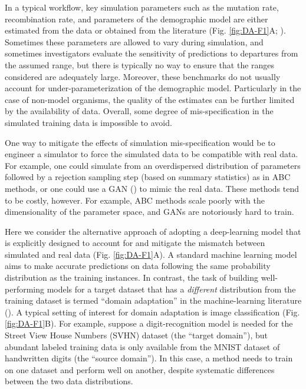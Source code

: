 In a typical workflow, key simulation parameters such as the mutation rate, recombination rate, and parameters of the demographic model are either estimated from the data or obtained from the literature (Fig. \ref{fig:DA-F1}A; \cite{adrion_community-maintained_2020,lauterbur_expanding_2022}). Sometimes these parameters are allowed to vary during simulation, and sometimes investigators evaluate the sensitivity of predictions to departures from the assumed range, but there is typically no way to ensure that the ranges considered are adequately large. Moreover, these benchmarks do not usually account for under-parameterization of the demographic model. Particularly in the case of non-model organisms, the quality of the estimates can be further limited by the availability of data. Overall, some degree of mis-specification in the simulated training data is impossible to avoid.

One way to mitigate the effects of simulation mis-specification would be to engineer a simulator to force the simulated data to be compatible with real data. For example, one could simulate from an overdispersed distribution of parameters followed by a rejection sampling step (based on summary statistics) as in \acf{ABC} methods, or one could use a \ac{GAN} (\cite{wang_automatic_2021}) to mimic the real data. These methods tend to be costly, however. For example, \ac{ABC} methods scale poorly with the dimensionality of the parameter space, and \acp{GAN} are notoriously hard to train.

Here we consider the alternative approach of adopting a deep-learning model that is explicitly designed to account for and mitigate the mismatch between simulated and real data (Fig. \ref{fig:DA-F1}A). A standard machine learning model aims to make accurate predictions on data following the same probability distribution as the training instances. In contrast, the task of building well-performing models for a target dataset that has a \textit{different} distribution from the training dataset is termed “domain adaptation” in the machine-learning literature (\cite{csurka_comprehensive_2017,wilson_survey_2020}). A typical setting of interest for domain adaptation is image classification (Fig. \ref{fig:DA-F1}B). For example, suppose a digit-recognition model is needed for the Street View House Numbers (SVHN) dataset (the “target domain”), but abundant labeled training data is only available from the MNIST dataset of handwritten digits (the “source domain”). In this case, a method needs to train on one dataset and perform well on another, despite systematic differences between the two data distributions.

